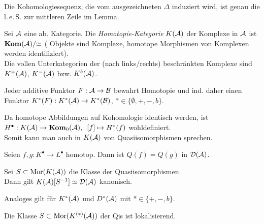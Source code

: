 \documentclass{cheat-sheet}
\newcommand{\CCC}[1]{{#1}^{\bullet}} %
\newcommand{\leS}{l.\,e.\,S.} %
\begin{document}
\begin{beweisidee}
  Die Kohomologiesequenz, die vom ausgezeichneten $\Delta$ induziert wird, ist genau die \leS{} zur mittleren Zeile im Lemma.
\end{beweisidee}



\begin{defn}
  Sei $\mathcal{A}$ eine ab. Kategorie. Die \emph{Homotopie-Kategorie} $K(\mathcal{A})$ der Komplexe in $\mathcal{A}$ ist $\mathbf{Kom}(\mathcal{A})/{\simeq}$ (\dh{} Objekte sind Komplexe, homotope Morphismen von Komplexen werden identifiziert). \\
  Die vollen Unterkategorien der (nach links/rechts) beschränkten Komplexe sind $K^+(\mathcal{A})$, $K^-(\mathcal{A})$ bzw. $K^b(\mathcal{A})$.
\end{defn}

\begin{bem}
  Jeder additive Funktor $F : \mathcal{A} \to \mathcal{B}$ bewahrt Homotopie und ind. daher einen Funktor $K^*(F) : K^*(\mathcal{A}) \to K^*(\mathcal{B})$, $* \in \{ \emptyset, {+}, {-}, b \}$.
\end{bem}

\begin{bem}
  Da homotope Abbildungen auf Kohomologie identisch werden, ist $H^\bullet : K(\mathcal{A}) \to \mathbf{Kom}_0(\mathcal{A}), \enspace [f] \mapsto H^*(f)$ wohldefiniert. \\
  Somit kann man auch in $K(\mathcal{A})$ von Quasiisomorphismen sprechen.
\end{bem}

\begin{lem}
  Seien $f, g : \CCC{K} \to \CCC{L}$ homotop. Dann ist $Q(f) \!=\! Q(g)$ in $\mathcal{D}(\mathcal{A})$.
\end{lem}

\begin{prop}
  Sei $S \subset \operatorname{Mor}(K(\mathcal{A}))$ die Klasse der Quasiisomorphismen. \\
  Dann gilt $K(\mathcal{A})[S^{-1}] \simeq \mathcal{D}(\mathcal{A})$ kanonisch.
\end{prop}

\begin{bem}
  Analoges gilt für $K^*(\mathcal{A})$ und $D^*(\mathcal{A})$ mit $* \in \{ {+}, {-}, b \}$.
\end{bem}

\begin{thm}
  Die Klasse $S \subset \operatorname{Mor}(K^{(*)}(\mathcal{A}))$ der Qis ist lokalisierend.
\end{thm}
\end{document}
